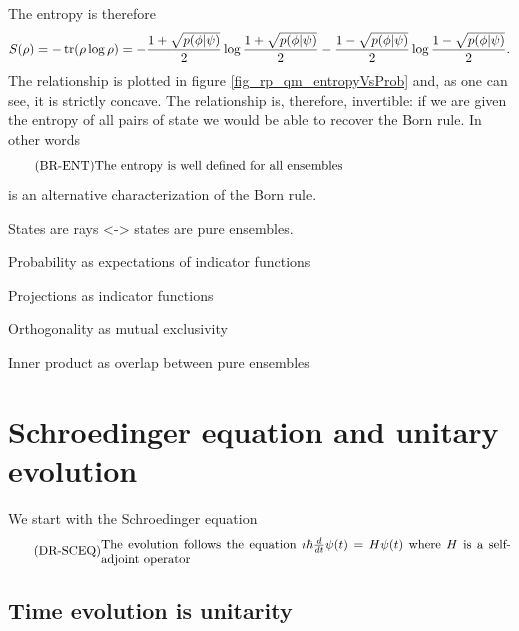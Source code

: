 The entropy is therefore
\begin{equation}
	\begin{aligned}
		S(\rho) = - \operatorname{tr}(\rho \log \rho) = - \frac{1+\sqrt{p(\phi|\psi)}}{2} \log \frac{1+\sqrt{p(\phi|\psi)}}{2} - \frac{1-\sqrt{p(\phi|\psi)}}{2} \log \frac{1-\sqrt{p(\phi|\psi)}}{2}.
	\end{aligned}
\end{equation}
The relationship is plotted in figure \ref{fig_rp_qm_entropyVsProb} and, as one can see, it is strictly concave. The relationship is, therefore, invertible: if we are given the entropy of all pairs of state we would be able to recover the Born rule. In other words
\begin{equation}\label{rp-qm-br-condEntropy}
	\tag{BR-ENT}
	\eqtext{The entropy is well defined for all ensembles} 
\end{equation}
is an alternative characterization of the Born rule.


States are rays <-> states are pure ensembles.

Probability as expectations of indicator functions

Projections as indicator functions

Orthogonality as mutual exclusivity

Inner product as overlap between pure ensembles

\section{Schroedinger equation and unitary evolution}

We start with the Schroedinger equation
\begin{equation}\label{rp-qm-uev-condSchroedingerEq}
	\tag{DR-SCEQ}
	\eqtext{The evolution follows the equation $\imath \hbar \frac{d}{dt} \psi(t) = H \psi(t)$ where $H$ is a self-adjoint operator}
\end{equation}

\subsection{Time evolution is unitarity}

